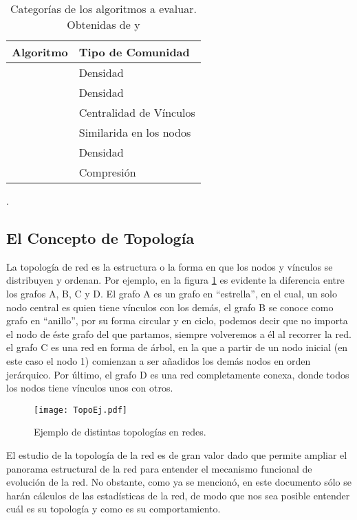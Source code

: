 \documentclass[12pt,letter]{article}
\begin{document}
\vspace{0.5cm}

\begin{table}[h!]
\centering
\begin{tabular}{ll}
\textbf{Algoritmo} & \textbf{Tipo de Comunidad}\\ \hline 
   \cite{Blondel} & Densidad\\
   \cite{Clauset} & Densidad\\
   \cite{Girvan1, Girvan2}  &  Centralidad de Vínculos\\
    \cite{Pons}  &  Similarida en los nodos\\
    \cite{Raghavan}  & Densidad\\
    \cite{Rosvall1} & Compresión \\ \hline
\end{tabular}
\caption{\small{Categorías de los algoritmos a evaluar. Obtenidas de \cite{Labatut} y \cite{Orman}}}.
\end{table}

\vspace{0.5cm}

\subsection{El Concepto de Topología}
La topología de red es la estructura o la forma en que los nodos y vínculos se distribuyen y ordenan. Por ejemplo, en la figura \ref{TopoEj} es evidente la diferencia entre los grafos A, B, C y D. El grafo A es un grafo en ``estrella'', en el cual, un solo nodo central es quien tiene vínculos con los demás, el grafo B se conoce como grafo en ``anillo'', por su forma circular y en ciclo, podemos decir que no importa el nodo de éste grafo del que partamos, siempre volveremos a él al recorrer la red. el grafo C es una red en forma de árbol, en la que a partir de un nodo inicial (en este caso el nodo 1) comienzan a ser añadidos los demás nodos en orden jerárquico. Por último, el grafo D es una red completamente conexa, donde todos los nodos tiene vínculos unos con otros.

\begin{figure}[h!]
\centering
\texttt{[image: TopoEj.pdf]}
\caption{\small{Ejemplo de distintas topologías en redes.}} \label{TopoEj}
\end{figure}

\vspace{0.5cm}
El estudio de la topología de la red es de gran valor dado que permite ampliar el panorama estructural de la red para entender el mecanismo funcional de evolución de la red. No obstante, como ya se mencionó, en este documento sólo se harán cálculos de las estadísticas de la red, de modo que nos sea posible entender cuál es su topología y como es su comportamiento.
\end{document}
